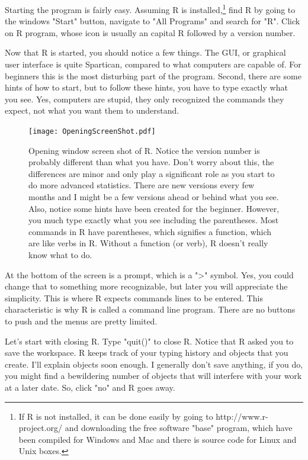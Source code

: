 \documentclass{tufte-handout}\usepackage[]{graphicx}\usepackage[]{color}
\begin{document}
Starting the program is fairly easy. Assuming R is installed,\footnote[][.03in]{If R is not installed, it can be done easily by going to http://www.r-project.org/ and downloading the free software "base" program, which have been compiled for Windows and Mac and there is source code for Linux and Unix boxes.} find R by going to the windows "Start" button, navigate to "All Programs" and search for "R". Click on R program, whose icon is usually an capital R followed by a version number. 

Now that R is started, you should notice a few things.  The GUI, or graphical user interface is quite Spartican, compared to what computers are capable of. For beginners this is the most disturbing part of the program. Second, there are some hints of how to start, but to follow these hints, you have to type exactly what you see. Yes, computers are stupid, they only recognized the commands they expect, not what you want them to understand. 

\begin{figure}
		\texttt{[image: OpeningScreenShot.pdf]}
	\caption{Opening window screen shot of R. Notice the version number is probably different than what you have. Don't worry about this, the differences are minor and only play a significant role as you start to do more advanced statistics. There are new versions every few months and I might be a few versions ahead or behind what you see. Also, notice some hints have been created for the beginner. However, you much type exactly what you see including the parentheses. Most commands in R have parentheses, which signifies a function, which are like verbs in R. Without a function (or verb), R doesn't really know what to do.}
	\label{fig:OpeningScreenShot}
\end{figure}

At the bottom of the screen is a prompt, which is a ">" symbol. Yes, you could change that to something more recognizable, but later you will appreciate the simplicity. This is where R expects commands lines to be entered. This characteristic is why R is called a command line program. There are no buttons to push and the menus are pretty limited.
  
Let's start with closing R.  Type "quit()" to close R. Notice that R asked you to save the workspace. R keeps track of your typing history and objects that you create. I'll explain objects soon enough. I generally don't save anything, if you do, you might find a bewildering number of objects that will interfere with your work at a later date. So, click "no" and R goes away.
\end{document}
